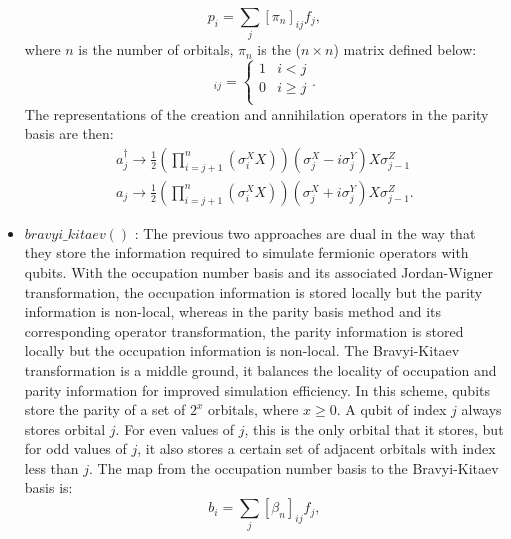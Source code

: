 \begin{itemize}
\begin{equation}
              p_i = \sum_j {[\pi_n]_{ij} f_j},
          \end{equation}
          where $n$ is the number of orbitals, $\pi_n$ is the ($n \times n$) matrix defined below:
          \begin{equation}
              [\pi_n]_{ij} =
              \begin{cases}
                  1 & i<j     \\
                  0 & i\geq j \\
              \end{cases}.
          \end{equation}
          The representations of the creation and annihilation operators in the parity basis are then:
          \begin{equation}
              \begin{split}
                  a_j^{\dagger} \to \frac{1}{2} (\prod_{i=j+1}^n ({\sigma}^X_i X))({\sigma}^X_j - i{\sigma}^Y_j) X {\sigma}^Z_{j-1} \\
                  a_j \to \frac{1}{2} (\prod_{i=j+1}^n ({\sigma}^X_i X))({\sigma}^X_j + i{\sigma}^Y_j) X {\sigma}^Z_{j-1}.
              \end{split}
          \end{equation}
    \item $bravyi\_kitaev()$ \cite{bravyi2002fermionic, fenwick1994new}: The previous two approaches are dual in the way that they store the information required to simulate fermionic operators with qubits. With the occupation number basis and its associated Jordan-Wigner transformation, the occupation information is stored locally but the parity information is non-local, whereas in the parity basis method and its corresponding operator transformation, the parity information is stored locally but the occupation information is non-local.
          The Bravyi-Kitaev transformation is a middle ground, it balances the locality of occupation and parity information for improved simulation efficiency. In this scheme, qubits store the parity of a set of $2^x$ orbitals, where $x \geq 0$. A qubit of index $j$ always stores orbital $j$. For even values of $j$, this is the only orbital that it stores, but for odd values of $j$, it also stores a certain set of adjacent orbitals with index less than $j$. The map from the occupation number basis to the Bravyi-Kitaev basis is:
          \begin{equation}
              b_i = \sum_j {[\beta_n]_{ij} f_j},
          \end{equation}

\end{itemize}
